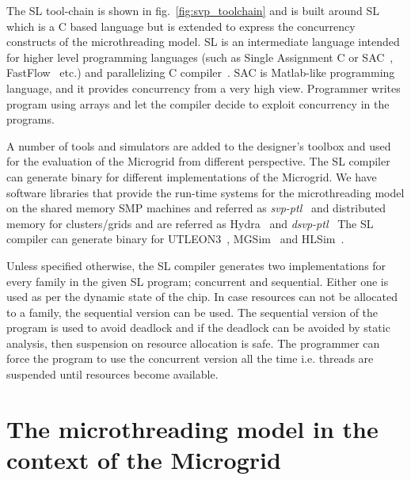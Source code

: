 \documentclass{article}
\begin{document}
The SL tool-chain is shown in fig.~\ref{fig:svp_toolchain} and is built around
SL~\cite{poss.12.sl} which is a C based language but is extended to express the
concurrency constructs of the microthreading model. SL is an intermediate
language intended for higher level programming languages (such as Single
Assignment C or
SAC~\cite{sac_tutorial:,grelck.09.cpc,GrelckJFP05,GrelSchoIJPP06,
Grelck:2007:SOS:1248648.1248654},
FastFlow~\cite{Aldinucci12fastflow:high-level,ff:distr:cgs:12} etc.) and
parallelizing C compiler~\cite{saougkos.09.cpc,saougkos.11}. SAC is Matlab-like
programming language, and it provides concurrency from a very high view.
Programmer writes program using arrays and let the compiler decide to exploit
concurrency in the programs.

A number of tools and simulators are added to the designer's toolbox and used
for the evaluation of the Microgrid from different perspective. The SL compiler
can generate binary for different implementations of the Microgrid. We have
software libraries that provide the run-time systems for the microthreading
model on the shared memory SMP machines and referred as
\emph{svp-ptl}~\cite{SVP-PTL2009} and distributed memory for clusters/grids and
are referred as Hydra~\cite{Andrei:msc_hydra:2010} and
\emph{dsvp-ptl}~\cite{DSVP-PTL2011} The SL compiler can generate binary for
UTLEON3~\cite{5491777,danek.12},
MGSim~\cite{Bousias:2009:IEM:1517865.1518255,poss.13.MGSim.SAMOS} and
HLSim~\cite{Irfan:multipe_levels_hlsim:2013, Irfan:oneipc_hlsim:2013,
Irfan.12.2013.signatures, Irfan.12.2013.CacheBased, Irfan.01.2014.analytical,
Irfan:hl_sim_ptl:2011, Irfan:msc_hlsim:2009, Uddin:2012:CSM:2162131.2162132}.

Unless specified otherwise, the SL compiler generates two implementations for
every family in the given SL program; concurrent and sequential. Either one is
used as per the dynamic state of the chip. In case resources can not be
allocated to a family, the sequential version can be used. The sequential
version of the program is used to avoid deadlock and if the deadlock can be
avoided by static analysis, then suspension on resource allocation is safe. The
programmer can force the program to use the concurrent version all the time
i.e. threads are suspended until resources become available. 

\section{The microthreading model in the context of the Microgrid}
\label{sn:microthreading_microgrid}
\end{document}
